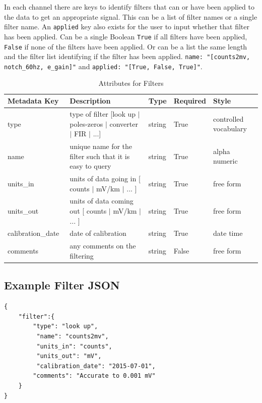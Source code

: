 \documentclass{article}
\begin{document}
In each channel there are keys to identify filters that can or have been applied to the data to get an appropriate signal.  This can be a list of filter names or a single filter name.  An \verb|applied| key also exists for the user to input whether that filter has been applied.  Can be a single Boolean \verb|True| if all filters have been applied, \verb|False| if none of the filters have been applied.  Or can be a list the same length and the filter list identifying if the filter has been applied.  \verb|name: "[counts2mv, notch_60hz, e_gain]"| and \verb|applied: "[True, False, True]"|. 

\begin{table}[htb!]
    \caption[Attributes for Filter]{Attributes for Filters}
    \begin{tabular}{|l|p{2.75in}|l|l|p{.95in}|}
    	\hline
    	\textbf{Metadata Key} & \textbf{Description} & \textbf{Type} & \textbf{Required} & \textbf{Style}\\ \hline
        type\ & type of filter [look up $|$ poles-zeros $|$ converter $|$ FIR $|$ ...]& string &  True  & controlled vocabulary \\ \hline
        name\ & unique name for the filter such that it is easy to query & string & True  & alpha numeric\\ \hline
        units\_in\ & units of data going in [ counts $|$ mV/km $|$ ... ] & string & True  & free form\\ \hline
        units\_out\ & units of data coming out [ counts $|$ mV/km $|$ ... ] & string & True  &  free form \\ \hline
        calibration\_date\ & date of calibration & string &  True  &  date time\\ \hline
        comments\ & any comments on the filtering & string &  False  &  free form \\ \hline
    \end{tabular}
    \label{tab:filter}
\end{table}

\subsection{Example Filter JSON} 

\begin{verbatim}
{
    "filter":{
        "type": "look up",
         "name": "counts2mv",
         "units_in": "counts",
         "units_out": "mV",
         "calibration_date": "2015-07-01",
        "comments": "Accurate to 0.001 mV"
    }
}
\end{verbatim}
\end{document}
